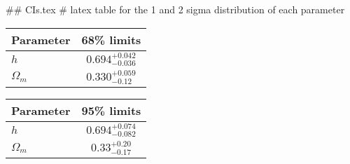 ## CIs.tex
# latex table for the 1 and 2 sigma distribution of each parameter

\begin{tabular} { l  c}
 Parameter &  68\% limits\\
\hline
{\boldmath$h              $} & $0.694^{+0.042}_{-0.036}   $\\
{\boldmath$\Omega_m       $} & $0.330^{+0.059}_{-0.12}    $\\
\hline
\end{tabular}

\begin{tabular} { l  c}
 Parameter &  95\% limits\\
\hline
{\boldmath$h              $} & $0.694^{+0.074}_{-0.082}   $\\
{\boldmath$\Omega_m       $} & $0.33^{+0.20}_{-0.17}      $\\
\hline
\end{tabular}
